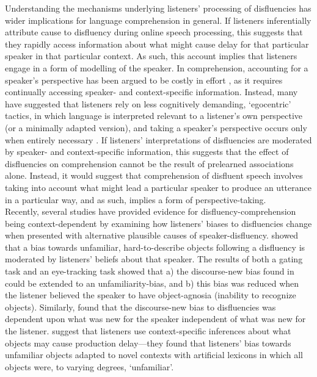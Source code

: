 \documentclass[a4paper,man,natbib]{apa6}
\begin{document}
Understanding the mechanisms underlying listeners' processing of disfluencies has wider implications for language comprehension in general. 
If listeners inferentially attribute cause to disfluency during online speech processing, this suggests that they rapidly access information about what might cause delay for that particular speaker in that particular context.
As such, this account implies that listeners engage in a form of modelling of the speaker.
In comprehension, accounting for a speaker's perspective has been argued to be costly in effort \citep{Lin2010}, as it requires continually accessing speaker- and context-specific information. 
Instead, many have suggested that listeners rely on less cognitively demanding, `egocentric' tactics, in which language is interpreted relevant to a listener's own perspective (or a minimally adapted version), and taking a speaker's perspective occurs only when entirely necessary \citep{Barr2004, Barr2014, Pickering2004, Kronmuller2007}.
If listeners' interpretations of disfluencies are moderated by speaker- and context-specific information, this suggests that the effect of disfluencies on comprehension cannot be the result of prelearned associations alone.
Instead, it would suggest that comprehension of disfluent speech involves taking into account what might lead a particular speaker to produce an utterance in a particular way, and as such, implies a form of perspective-taking.\\

Recently, several studies have provided evidence for disfluency-comprehension being context-dependent by examining how listeners' biases to disfluencies change when presented with alternative plausible causes of speaker-disfluency. 
\citet{Arnold2007} showed that a bias towards unfamiliar, hard-to-describe objects following a disfluency is moderated by listeners' beliefs about that speaker. 
The results of both a gating task and an eye-tracking task showed that a) the discourse-new bias found in \citet{Arnold2004} could be extended to an unfamiliarity-bias, and b) this bias was reduced when the listener believed the speaker to have object-agnosia (inability to recognize objects). 
Similarly, \citet{Barr2010} found that the discourse-new bias to disfluencies was dependent upon what was new for the speaker independent of what was new for the listener.
\citet{Heller2015} suggest that listeners use context-specific inferences about what objects may cause production delay---they found that listeners' bias towards unfamiliar objects adapted to novel contexts with artificial lexicons in which all objects were, to varying degrees, `unfamiliar'.\\
\end{document}
